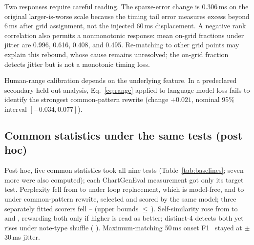 \documentclass[letterpaper]{article}
\begin{document}
Two responses require careful reading. The sparse-error change is 0.306\,ms
on the original larger-is-worse scale because the timing tail error measures
excess beyond 6\,ms after grid assignment, not the injected 60\,ms
displacement. A negative rank correlation also permits a nonmonotonic
response: mean on-grid fractions under jitter are 0.996, 0.616, 0.408, and
0.495. Re-matching to other grid points may explain this rebound, whose
cause remains unresolved; the on-grid fraction detects jitter but is not a
monotonic timing loss.

Human-range calibration depends on the underlying feature. In a
predeclared secondary held-out analysis, Eq.~\ref{eq:range} applied to
language-model loss fails to identify the strongest common-pattern rewrite
(change $+0.021$, nominal 95\% interval $[-0.034,0.077]$).

\subsection{Common statistics under the same tests (post hoc)}
\label{sec:baselines}
\begin{table}[t]
\centering
\caption{Common statistics under the held-out tests on 80 songs (post hoc,
not prespecified). Columns 1--9: edits in Table~\ref{tab:results} row
order. \checkmark: passes its rule; $\circ$: unchanged at
every seed and strength; $\times$: moves toward the conventionally better
value (lower perplexity; higher self-similarity, if read as better), both
intervals excluding zero; --: unchanged by design (time-only statistic,
type-only edit).}
\label{tab:baselines}
\setlength{\tabcolsep}{3.5pt}
\fontsize{9}{11}\selectfont

\end{table}
Post hoc, five common statistics took all nine
tests (Table~\ref{tab:baselines}; seven more were also computed);
each ChartGenEval measurement got only its target test. Perplexity fell from \BlPplUnedited{} to
\BlPplLoopAfter{} under loop replacement, which is model-free,
and to \BlPplCommonAfter{} under common-pattern rewrite, selected and
scored by the same model; three separately fitted scorers fell \BlPplCommonCrossMin{}--\BlPplCommonCrossMax{} (upper bounds
${\le}\,$\BlPplCommonCrossWorstUpper{}). Self-similarity rose from
\BlSelfSimUnedited{} to \BlSelfSimLoopAfter{} and \BlSelfSimCommonAfter{},
rewarding both only if higher is read as better; distinct-4 detects
both yet rises under note-type shuffle (\BlDistinctFourShuffleDelta{}
\BlDistinctFourShuffleDeltaCI{}). Maximum-matching
50\,ms onset F1~\cite{mirevalOnset} stayed \BlFOneFiftyJitter{} at
$\pm$30\,ms jitter.
\end{document}
